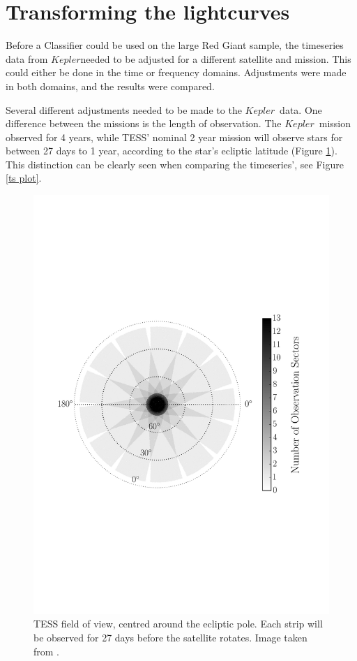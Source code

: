 \documentclass[a4paper,fleqn,usenatbib,useAMS]{mnras}
\newcommand{\kep}{\ensuremath{Kepler}\:}
\begin{document}
\section{Transforming the lightcurves}
\label{sect: dataset}

Before a Classifier could be used on the large Red Giant sample, the timeseries data from \kep needed to be adjusted for a different satellite and mission. This could either be done in the time or frequency domains. Adjustments were made in both domains, and the results were compared. %

Several different adjustments needed to be made to the \kep \ data. One difference between the missions is the length of observation. The \kep \ mission observed for 4 years, while TESS' nominal 2 year mission will observe stars for between 27 days to 1 year, according to the star's ecliptic latitude (Figure \ref{TESS field}). This distinction can be clearly seen when comparing the timeseries', see Figure \ref{ts plot}.

\begin{figure}
	\centering
	\includegraphics[scale=0.4]{cropped_TESSfield.pdf}
	\caption{TESS field of view, centred around the ecliptic pole. Each strip will be observed for 27 days before the satellite rotates. Image taken from \citet{campante_asteroseismic_2016}.}	
	\label{TESS field}
\end{figure} 
\end{document}
